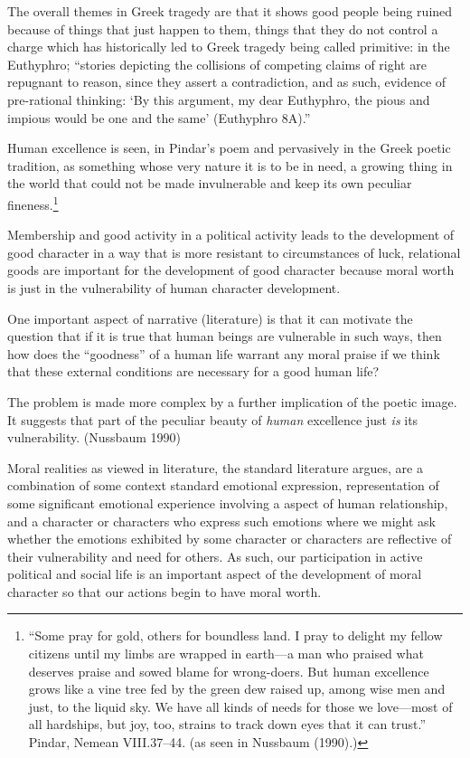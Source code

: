 \documentclass[
  letterpaper,
  DIV=11,
  numbers=noendperiod]{scrartcl}
\theoremstyle{remark}
\begin{document}
The overall themes in Greek tragedy are that it shows good people being
ruined because of things that just happen to them, things that they do
not control a charge which has historically led to Greek tragedy being
called primitive: in the Euthyphro; ``stories depicting the collisions
of competing claims of right are repugnant to reason, since they assert
a contradiction, and as such, evidence of pre-rational thinking: `By
this argument, my dear Euthyphro, the pious and impious would be one and
the same' (Euthyphro 8A).''

Human excellence is seen, in Pindar's poem and pervasively in the Greek
poetic tradition, as something whose very nature it is to be in need, a
growing thing in the world that could not be made invulnerable and keep
its own peculiar fineness.\footnote{``Some pray for gold, others for
  boundless land. I pray to delight my fellow citizens until my limbs
  are wrapped in earth---a man who praised what deserves praise and
  sowed blame for wrong-doers. But human excellence grows like a vine
  tree fed by the green dew raised up, among wise men and just, to the
  liquid sky. We have all kinds of needs for those we love---most of all
  hardships, but joy, too, strains to track down eyes that it can
  trust.'' Pindar, Nemean VIII.37--44. (as seen in Nussbaum (1990).)}

Membership and good activity in a political activity leads to the
development of good character in a way that is more resistant to
circumstances of luck, relational goods are important for the
development of good character because moral worth is just in the
vulnerability of human character development.

One important aspect of narrative (literature) is that it can motivate
the question that if it is true that human beings are vulnerable in such
ways, then how does the ``goodness'' of a human life warrant any moral
praise if we think that these external conditions are necessary for a
good human life?

The problem is made more complex by a further implication of the poetic
image. It suggests that part of the peculiar beauty of \emph{human}
excellence just \emph{is} its vulnerability. (Nussbaum 1990)

Moral realities as viewed in literature, the standard literature argues,
are a combination of some context standard emotional expression,
representation of some significant emotional experience involving a
aspect of human relationship, and a character or characters who express
such emotions where we might ask whether the emotions exhibited by some
character or characters are reflective of their vulnerability and need
for others. As such, our participation in active political and social
life is an important aspect of the development of moral character so
that our actions begin to have moral worth.
\end{document}
